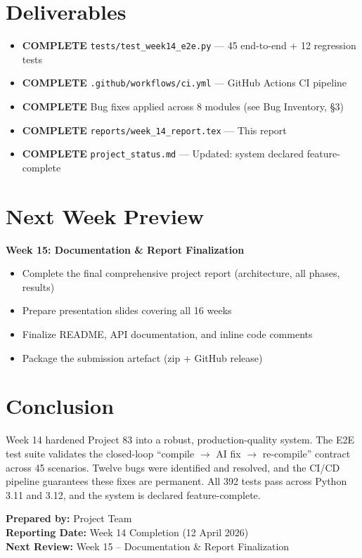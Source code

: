 \documentclass[a4paper,11pt]{article}
\newcommand{\statusgood}[1]{\colorbox{green!20}{\textbf{#1}}}
\begin{document}
\section{Deliverables}

\begin{itemize}[leftmargin=*]
    \item \statusgood{COMPLETE} \texttt{tests/test\_week14\_e2e.py} --- 45 end-to-end + 12 regression tests
    \item \statusgood{COMPLETE} \texttt{.github/workflows/ci.yml} --- GitHub Actions CI pipeline
    \item \statusgood{COMPLETE} Bug fixes applied across 8 modules (see Bug Inventory, \S3)
    \item \statusgood{COMPLETE} \texttt{reports/week\_14\_report.tex} --- This report
    \item \statusgood{COMPLETE} \texttt{project\_status.md} --- Updated: system declared feature-complete
\end{itemize}

\section{Next Week Preview}

\textbf{Week 15: Documentation \& Report Finalization}

\begin{itemize}[leftmargin=*]
    \item Complete the final comprehensive project report (architecture, all phases, results)
    \item Prepare presentation slides covering all 16 weeks
    \item Finalize README, API documentation, and inline code comments
    \item Package the submission artefact (zip + GitHub release)
\end{itemize}

\section{Conclusion}

Week 14 hardened Project 83 into a robust, production-quality system. The E2E test suite validates the closed-loop ``compile $\to$ AI fix $\to$ re-compile'' contract across 45 scenarios. Twelve bugs were identified and resolved, and the CI/CD pipeline guarantees these fixes are permanent. All 392 tests pass across Python 3.11 and 3.12, and the system is declared feature-complete.

\vspace{5mm}
\noindent\textbf{Prepared by:} Project Team \\
\textbf{Reporting Date:} Week 14 Completion (12 April 2026) \\
\textbf{Next Review:} Week 15 -- Documentation \& Report Finalization
\end{document}
